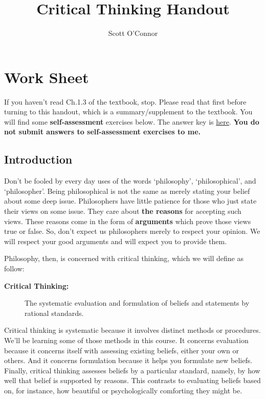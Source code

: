 \documentclass[]{article}
\title{Critical Thinking Handout}
\author{Scott O’Connor}
\begin{document}
\maketitle

\section{Work Sheet}\label{work-sheet}

If you haven't read Ch.1.3 of the textbook, stop. Please read that first
before turning to this handout, which is a summary/supplement to the
textbook. You will find some \textbf{self-assessment} exercises below.
The answer key is \href{Teaching/Examined/CT/Answers}{here}. \textbf{You
do not submit answers to self-assessment exercises to me.}

\subsection{Introduction}\label{introduction}

Don't be fooled by every day uses of the words `philosophy',
`philosophical', and `philosopher'. Being philosophical is not the same
as merely stating your belief about some deep issue. Philosophers have
little patience for those who just state their views on some issue. They
care about \textbf{the reasons} for accepting such views. These reasons
come in the form of \textbf{arguments} which prove those views true or
false. So, don't expect us philosophers merely to respect your opinion.
We will respect your good arguments and will expect you to provide them.

Philosophy, then, is concerned with critical thinking, which we will
define as follow:

\begin{description}
\item[\textbf{Critical Thinking:}]
The systematic evaluation and formulation of beliefs and statements by
rational standards.
\end{description}

Critical thinking is systematic because it involves distinct methods or
procedures. We'll be learning some of those methods in this course. It
concerns evaluation because it concerns itself with assessing existing
beliefs, either your own or others. And it concerns formulation because
it helps you formulate new beliefs. Finally, critical thinking assesses
beliefs by a particular standard, namely, by how well that belief is
supported by reasons. This contrasts to evaluating beliefs based on, for
instance, how beautiful or psychologically comforting they might be.
\end{document}
